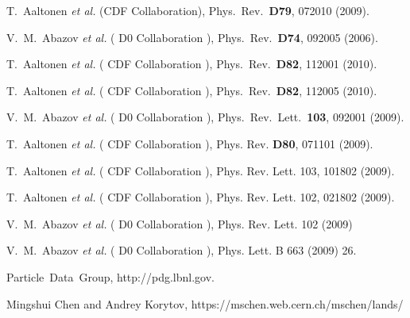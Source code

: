 T.~Aaltonen {\it et al.} (CDF Collaboration),  Phys.\ Rev.\  {\bf D79}, 072010 (2009).

V.~M.~Abazov {\it et al.} ( D0 Collaboration ), Phys.\ Rev.\  {\bf D74}, 092005 (2006).

T.~Aaltonen {\it et al.} ( CDF Collaboration ), Phys.\ Rev.\  {\bf D82}, 112001 (2010).

T.~Aaltonen {\it et al.} ( CDF Collaboration ), Phys.\ Rev.\  {\bf D82}, 112005 (2010).

V.~M.~Abazov {\it et al.} ( D0 Collaboration ), Phys.\ Rev.\ Lett.\  {\bf 103}, 092001 (2009).

T.~Aaltonen {\it et al.} ( CDF Collaboration ), Phys. Rev. {\bf D80}, 071101 (2009). 

T.~Aaltonen {\it et al.} ( CDF Collaboration ), Phys. Rev. Lett. 103, 101802 (2009).

T.~Aaltonen {\it et al.} ( CDF Collaboration ), Phys. Rev. Lett. 102, 021802 (2009).

V.~M.~Abazov {\it et al.} ( D0 Collaboration ), Phys. Rev. Lett. 102 (2009)

V.~M.~Abazov {\it et al.} ( D0 Collaboration ), Phys. Lett. B 663 (2009) 26.

Particle~Data~Group, http://pdg.lbnl.gov.

Mingshui Chen and Andrey Korytov, https://mschen.web.cern.ch/mschen/lands/

